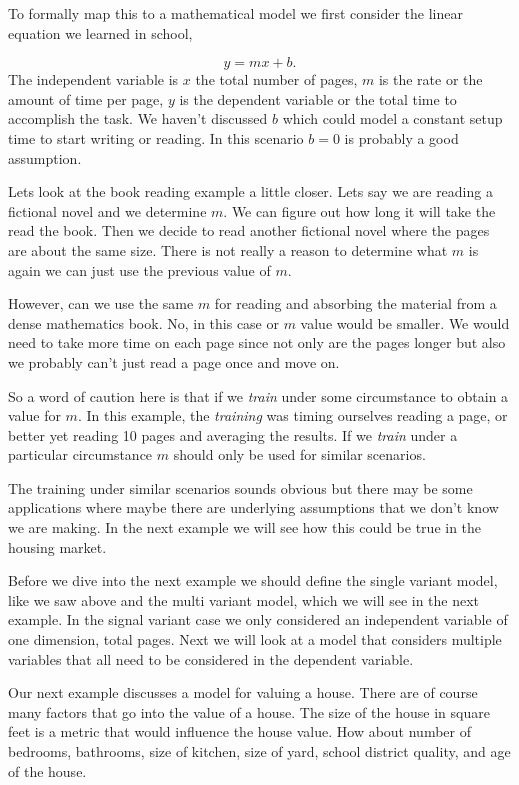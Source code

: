 To formally map this to a mathematical model we first consider the linear equation we learned in school,

\begin{equation}
y = mx+b.
\label{eq:svlinmodel}
\end{equation}
\noindent
The independent variable is $x$ the total number of pages, $m$ is the rate or the amount of time per page, $y$ is the dependent variable or the total time to accomplish the task. We haven't discussed $b$ which could model a constant setup time to start writing or reading. In this scenario $b=0$ is probably a good assumption. 

Lets look at the book reading example a little closer. Lets say we are reading a fictional novel and we determine $m$. We can figure out how long it will take the read the book. Then we decide to read another fictional novel where the pages are about the same size. There is not really a reason to determine what $m$ is again we can just use the previous value of $m$. 

However, can we use the same $m$ for reading and absorbing the material from a dense mathematics book. No, in this case or $m$ value would be smaller. We would need to take more time on each page since not only are the pages longer but also we probably can't just read a page once and move on.

So a word of caution here is that if we \emph{train} under some circumstance to obtain a value for $m$. In this example, the \emph{training} was timing ourselves reading a page, or better yet reading 10 pages and averaging the results. If we \emph{train} under a particular circumstance $m$ should only be used for similar scenarios. 

The training under similar scenarios sounds obvious but there may be some applications where maybe there are underlying assumptions that we don't know we are making. In the next example we will see how this could be true in the housing market. 

Before we dive into the next example we should define the single variant model, like we saw above and the multi variant model, which we will see in the next example. In the signal variant case we only considered an independent variable of one dimension, total pages. Next we will look at a model that considers multiple variables that all need to be considered in the dependent variable. 

Our next example discusses a model for valuing a house. There are of course many factors that go into the value of a house. The size of the house in square feet is a metric that would influence the house value. How about number of bedrooms, bathrooms, size of kitchen, size of yard, school district quality, and age of the house. 


